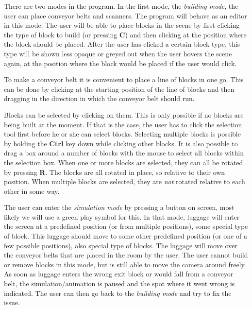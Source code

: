There are two modes in the program. In the first mode, the \textit{building mode}, the user can place conveyor belts and scanners. The program will behave as an editor in this mode. The user will be able to place blocks in the scene by first clicking the type of block to build (or pressing \textbf{C}) and then clicking at the position where the block should be placed. After the user has clicked a certain block type, this type will be shown less opaque or greyed out when the user hovers the scene again, at the position where the block would be placed if the user would click.

To make a conveyor belt it is convenient to place a line of blocks in one go. This can be done by clicking at the starting position of the line of blocks and then dragging in the direction in which the conveyor belt should run.

Blocks can be selected by clicking on them. This is only possible if no blocks are being built at the moment. If that is the case, the user has to click the selection tool first before he or she can select blocks. Selecting multiple blocks is possible by holding the \textbf{Ctrl} key down while clicking other blocks. It is also possible to drag a box around a number of blocks with the mouse to select all blocks within the selection box. When one or more blocks are selected, they can all be rotated by pressing \textbf{R}. The blocks are all rotated in place, so relative to their own position. When multiple blocks are selected, they are \emph{not} rotated relative to each other in some way.

The user can enter the \textit{simulation mode} by pressing a button on screen, most likely we will use a green play symbol for this. In that mode, luggage will enter the screen at a predefined position (or from multiple positions), some special type of block. This luggage should move to some other predefined position (or one of a few possible positions), also special type of blocks. The luggage will move over the conveyor belts that are placed in the room by the user. The user cannot build or remove blocks in this mode, but is still able to move the camera around freely. As soon as luggage enters the wrong exit block or would fall from a conveyor belt, the simulation/animation is paused and the spot where it went wrong is indicated. The user can then go back to the \textit{building mode} and try to fix the issue.